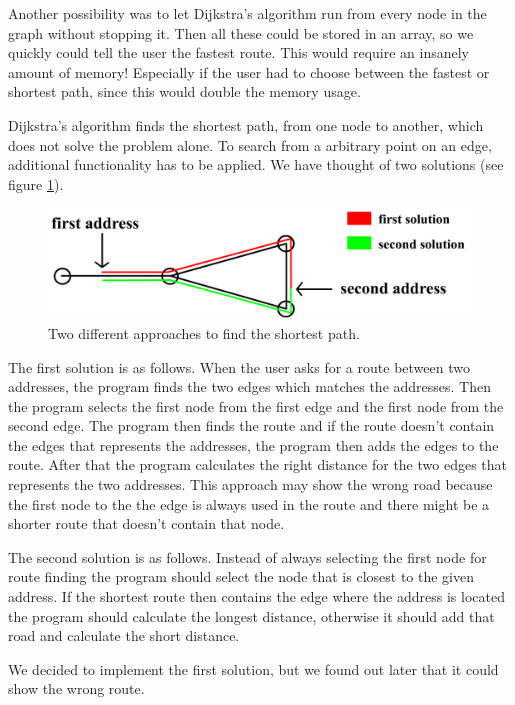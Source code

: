 \documentclass[a4paper,10pt,titlepage]{article}
\begin{document}
Another possibility was to let Dijkstra’s algorithm run from every node in the graph without stopping it. Then all these could be stored in an array, so we quickly could tell the user the fastest route. This would require an insanely amount of memory! Especially if the user had to choose between the fastest or shortest path, since this would double the memory usage. 

Dijkstra's algorithm finds the shortest path, from one node to another, which does not solve the problem alone. To search from a arbitrary point on an edge, additional functionality has to be applied. We have thought of two solutions (see figure \ref{fig:routeFinding}). 

\begin{figure}[H]
\includegraphics[width=120mm]{routeFinding.png}
\caption{Two different approaches to find the shortest path.}
\label{fig:routeFinding}
\end{figure}

The first solution is as follows. When the user asks for a route between two addresses, the program finds the two edges which matches the addresses. Then the program selects the first node from the first edge and the first node from the second edge. The program then finds the route and if the route doesn't contain the edges that represents the addresses, the program then adds the edges to the route. After that the program calculates the right distance for the two edges that represents the two addresses.  This approach may show the wrong road because the first node to the the edge is always used in the route and there might be a shorter route that doesn't contain that node. 

The second solution is as follows. Instead of always selecting the first node for route finding the program should select the node that is closest to the given address. If the shortest route then contains the edge where the address is located the program should calculate the longest distance, otherwise it should add that road and calculate the short distance.

We decided to implement the first solution, but we found out later that it could show the wrong route. \\
\end{document}
